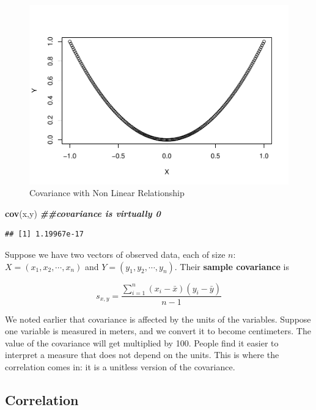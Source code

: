 \documentclass[
]{book}
\newenvironment{Shaded}{\begin{snugshade}}{\end{snugshade}}
\newcommand{\DocumentationTok}[1]{\textcolor[rgb]{0.56,0.35,0.01}{\textbf{\textit{#1}}}}
\newcommand{\FunctionTok}[1]{\textcolor[rgb]{0.13,0.29,0.53}{\textbf{#1}}}
\newcommand{\NormalTok}[1]{#1}
\begin{document}
\begin{figure}
\centering
\includegraphics{bookdown-demo_files/figure-latex/5-cov0-1.pdf}
\caption{\label{fig:5-cov0}Covariance with Non Linear Relationship}
\end{figure}

\begin{Shaded}
\begin{Highlighting}[]
\FunctionTok{cov}\NormalTok{(x,y) }\DocumentationTok{\#\#covariance is virtually 0}
\end{Highlighting}
\end{Shaded}

\begin{verbatim}
## [1] 1.19967e-17
\end{verbatim}

Suppose we have two vectors of observed data, each of size \(n\): \(X = (x_1, x_2, \cdots, x_n)\) and \(Y = (y_1, y_2, \cdots, y_n)\). Their \textbf{sample covariance} is

\begin{equation} 
s_{x,y} = \frac{\sum_{i=1}^n (x_i - \bar{x})(y_i - \bar{y})}{n-1}
\label{eq:5-sampcov}
\end{equation}

We noted earlier that covariance is affected by the units of the variables. Suppose one variable is measured in meters, and we convert it to become centimeters. The value of the covariance will get multiplied by 100. People find it easier to interpret a measure that does not depend on the units. This is where the correlation comes in: it is a unitless version of the covariance.

\subsection{Correlation}\label{correlation}
\end{document}
